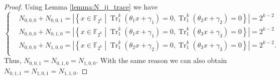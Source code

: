 \documentclass{article}
\newcommand{\F}{\mathbb{F}}
\newcommand{\TRACE}{\operatorname{Tr}_1^k}
\theoremstyle{nonumberplain}
\newtheorem{proof}{Proof}
\newcommand{\0}{\textbf{0}}
\newcommand{\1}{\textbf{1}}
\begin{document}
\begin{proof}
    Using Lemma \ref{lemma:N_ij_trace} we have  
    \begin{equation}\label{eq:from_lemma_1}\left\{\begin{alignedat}{3}
       &N_{0,0,0}+N_{0,0,1}=\left\lvert\left\{x\in\F_{2^k}\middle|\TRACE\left(\theta_1x+\gamma_1\right)=0, \TRACE\left(\theta_2x+\gamma_2\right)=0\right\}\right\rvert=2^{k-2}\\
       &N_{0,0,0}+N_{0,1,0}=\left\lvert\left\{x\in\F_{2^k}\middle|\TRACE\left(\theta_1x+\gamma_1\right)=0, \TRACE\left(\theta_3x+\gamma_3\right)=0\right\}\right\rvert=2^{k-2}\\
       &N_{0,0,0}+N_{1,0,0}=\left\lvert\left\{x\in\F_{2^k}\middle|\TRACE\left(\theta_2x+\gamma_2\right)=0, \TRACE\left(\theta_3x+\gamma_3\right)=0\right\}\right\rvert=2^{k-2}.\\
    \end{alignedat}\right.\end{equation}
    Thus, $ N_{0,0,1}=N_{0,1,0}=N_{1,0,0} $. With the same reason we can also obtain  $ N_{0,1,1}=N_{1,0,1}=N_{1,1,0} $. 


\end{proof}
\end{document}
